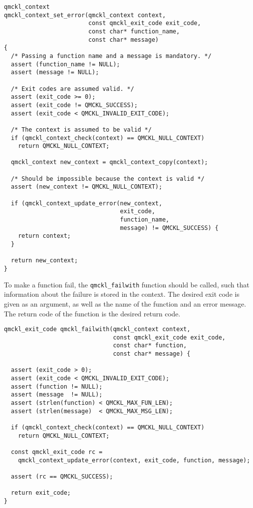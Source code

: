 \begin{verbatim}
qmckl_context
qmckl_context_set_error(qmckl_context context,
                        const qmckl_exit_code exit_code,
                        const char* function_name,
                        const char* message)
{
  /* Passing a function name and a message is mandatory. */
  assert (function_name != NULL);
  assert (message != NULL);

  /* Exit codes are assumed valid. */
  assert (exit_code >= 0);
  assert (exit_code != QMCKL_SUCCESS);
  assert (exit_code < QMCKL_INVALID_EXIT_CODE);

  /* The context is assumed to be valid */
  if (qmckl_context_check(context) == QMCKL_NULL_CONTEXT)
    return QMCKL_NULL_CONTEXT;

  qmckl_context new_context = qmckl_context_copy(context);

  /* Should be impossible because the context is valid */
  assert (new_context != QMCKL_NULL_CONTEXT);

  if (qmckl_context_update_error(new_context,
                                 exit_code,
                                 function_name,
                                 message) != QMCKL_SUCCESS) {
    return context;
  }

  return new_context;
}
\end{verbatim}


To make a function fail, the \texttt{qmckl\_failwith} function should be
called, such that information about the failure is stored in
the context. The desired exit code is given as an argument, as
well as the name of the function and an error message. The return
code of the function is the desired return code.

\begin{verbatim}
qmckl_exit_code qmckl_failwith(qmckl_context context,
                               const qmckl_exit_code exit_code,
                               const char* function,
                               const char* message) {

  assert (exit_code > 0);
  assert (exit_code < QMCKL_INVALID_EXIT_CODE);
  assert (function != NULL);
  assert (message  != NULL);
  assert (strlen(function) < QMCKL_MAX_FUN_LEN);
  assert (strlen(message)  < QMCKL_MAX_MSG_LEN);

  if (qmckl_context_check(context) == QMCKL_NULL_CONTEXT)
    return QMCKL_NULL_CONTEXT;
  
  const qmckl_exit_code rc = 
    qmckl_context_update_error(context, exit_code, function, message);

  assert (rc == QMCKL_SUCCESS);

  return exit_code;
}

\end{verbatim}


